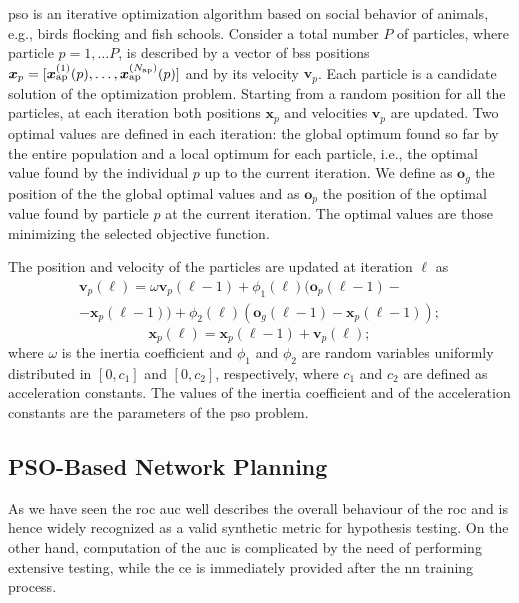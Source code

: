 \documentclass[conference,final]{IEEEtran}
\begin{document}
\ac{pso} is an iterative optimization algorithm based on social behavior of animals, e.g., birds flocking and fish schools. Consider a total number $P$ of particles, where  particle $p=1, \ldots P$, is described by a vector of \acp{bs} positions $\bm{x}_p = [\bm{x}_{\rm ap}^{(1)}(p),\ldots, \bm{x}_{\rm ap}^{(N_{\rm ap})}(p)]$ and by its velocity $\bm{v}_p$.  Each particle is a candidate solution of the optimization problem. Starting from a random position for all the particles, at each iteration both  positions $\bm{x}_p$ and  velocities $\bm{v}_p$ are updated. Two optimal values are defined in each iteration: the global optimum found so far by the entire population and a local optimum for each particle, i.e., the optimal value found by the individual $p$ up to the current iteration. We define as $\bm{o}_g$ the position of the the global optimal values and as $\bm{o}_p$ the position of the optimal value found by particle $p$ at the current iteration. The optimal values are those minimizing the selected objective function.

The position and velocity of the particles are updated at iteration $\ell$ as \cite{Kennedy-11}
   \begin{equation}\label{eq: v up}
\begin{split}
  \bm{v}_p(\ell) = \omega \bm{v}_p(\ell-1)+\phi_1(\ell)(\bm{o}_p(\ell-1)-\\
  -\bm{x}_p(\ell-1))+\phi_2(\ell)(\bm{o}_g(\ell-1)-\bm{x}_p(\ell-1));
  \end{split}
  \end{equation}
  \begin{equation}\label{eq: p up}
  \bm{x}_p(\ell) = \bm{x}_p(\ell-1) + \bm{v}_p(\ell);
 \end{equation}
where $\omega$ is the inertia coefficient and $\phi_1$ and $\phi_2$ are random variables uniformly distributed in $[0,c_1]$ and $[0,c_2]$, respectively, where $c_1$ and $c_2$ are defined as acceleration constants. The values of the inertia coefficient and of the acceleration constants are the parameters of the \ac{pso} problem.

\subsection{PSO-Based Network Planning}

As we have seen the \ac{roc} \ac{auc} well describes the overall behaviour of the \ac{roc} and is hence widely recognized as a valid synthetic metric for hypothesis testing. On the other hand, computation of the \ac{auc} is complicated by the need of performing extensive testing, while the \ac{ce} is immediately provided after the \ac{nn} training process. 
\end{document}
